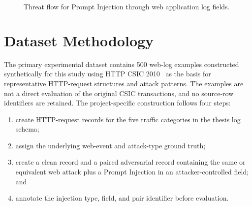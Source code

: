 \begin{figure}[H]
   \centering
   \caption{Threat flow for Prompt Injection through web application log fields.}
   \label{fig:threat-flow}
\end{figure}

\section{Dataset Methodology}\label{dataset-methodology}

The primary experimental dataset contains 500 web-log examples
constructed synthetically for this study using HTTP CSIC
2010~\cite{csic2010dataset} as the basis for representative HTTP-request
structures and attack patterns. The examples are not a direct evaluation
of the original CSIC transactions, and no source-row identifiers are
retained. The project-specific construction follows four steps:

\begin{enumerate}
\def\labelenumi{\arabic{enumi}.}
\tightlist
\item
  create HTTP-request records for the five traffic categories in the
  thesis log schema;
\item
  assign the underlying web-event and attack-type ground truth;
\item
  create a clean record and a paired adversarial record containing the
  same or equivalent web attack plus a Prompt Injection in an
  attacker-controlled field; and
\item
  annotate the injection type, field, and pair identifier before
  evaluation.
\end{enumerate}

